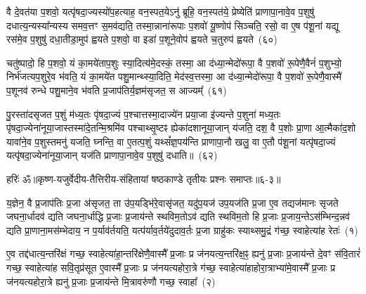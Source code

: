 वै दे॒वत॑या प॒शवो॒ यत्पृ॑षदा॒ज्यस्यो॑प॒हत्याह॒ वन॒स्पत॒ये\-ऽनु॑ ब्रूहि॒ वन॒स्पत॑ये॒ प्रेष्येति॑ प्राणापा॒नावे॒व प॒शुषु॑ दधात्य॒न्यस्या᳚न्यस्य समव॒त्तꣳ स॒मव॑द्यति॒ तस्मा॒न्नाना॑रूपाः प॒शवो॑ यू॒ष्णोप॑ सिञ्चति॒ रसो॒ वा ए॒ष प॑शू॒नां यद्यू रस॑मे॒व प॒शुषु॑ दधा॒तीडा॒मुप॑ ह्वयते प॒शवो॒ वा इडा॑ प॒शूने॒वोप॑ ह्वयते च॒तुरुप॑ ह्वयते~(६०)\ip

चतु॑ष्पादो॒ हि प॒शवो॒ यं का॒मये॑ताप॒शुः स्या॒दित्य॑मे॒दस्कं॒ तस्मा॒ आ द॑ध्या॒न्मेदो॑रूपा॒ वै प॒शवो॑ रू॒पेणै॒वैनं॑ प॒शुभ्यो॒ निर्भ॑जत्यप॒शुरे॒व भ॑वति॒ यं का॒मये॑त पशु॒मान्थ्स्या॒दिति॒ मेद॑स्व॒त्तस्मा॒ आ द॑ध्या॒न्मेदो॑रूपा॒ वै प॒शवो॑ रू॒पेणै॒वास्मै॑ प॒शूनव॑ रुन्धे पशु॒माने॒व भ॑वति प्र॒जा\-प॑तिर्य॒ज्ञम॑सृजत॒ स आज्यम्᳚~(६१)\ip

पु॒रस्ता॑दसृजत प॒शुं म॑ध्य॒तः पृ॑षदा॒ज्यं प॒श्चात्तस्मा॒दाज्ये॑न प्रया॒जा इ॑ज्यन्ते प॒शुना॑ मध्य॒तः पृ॑षदा॒ज्येना॑नूया॒जास्तस्मा॑दे॒तन्मि॒श्रमि॑व पश्चाथ्सृ॒ष्टꣴ ह्येका॑\-दशानूया॒जान् य॑जति॒ दश॒ वै प॒शोः प्रा॒णा आ॒त्मैका॑द॒शो यावा॑ने॒व प॒शुस्तमनु॑ यजति॒ घ्नन्ति॒ वा ए॒तत्प॒शुं यथ्सं᳚ज्ञ॒पय॑न्ति प्राणापा॒नौ खलु॒ वा ए॒तौ प॑शू॒नां यत्पृ॑षदा॒ज्यं यत्पृ॑षदा॒ज्येना॑नूया॒जान् यज॑ति प्राणापा॒नावे॒व प॒शुषु॑ दधाति॥~(६२)\ip

{\anuvakamend[{घ्नन्ति॒ यन्तं॒ खलु॑ च॒तुरुप॑ ह्वयत॒ आज्यं॒ यत्पृ॑षदा॒ज्येन॒ षट्च॑}]}%

{हरिः॑ ॐ}{॥कृष्ण-यजुर्वेदीय-तैत्तिरीय-संहितायां षष्ठकाण्डे तृतीयः प्रश्नः समाप्तः॥६-३॥}



\setcounter{anuvakam}{0}
य॒ज्ञेन॒ वै प्र॒जा\-प॑तिः प्र॒जा अ॑सृजत॒ ता उ॑प॒यड्भि॑रे॒वासृ॑जत॒ यदु॑प॒यज॑ उप॒यज॑ति प्र॒जा ए॒व तद्यज॑मानः सृजते जघना॒र्धादव॑ द्यति जघना॒र्धाद्धि प्र॒जाः प्र॒जाय॑न्ते स्थविम॒तो\-ऽव॑ द्यति स्थविम॒तो हि प्र॒जाः प्र॒जाय॒न्ते\-ऽस॑म्भिन्द॒न्नव॑ द्यति प्रा॒णाना॒मस॑म्भेदाय॒ न प॒र्याव॑र्तयति॒ यत्प॑र्याव॒र्तये॑दुदाव॒र्तः प्र॒जा ग्राहु॑कः स्याथ्समु॒द्रं ग॑च्छ॒ स्वाहेत्या॑ह रेतः॑~(१)\ip

ए॒व तद्द॑धात्य॒न्तरि॑क्षं गच्छ॒ स्वाहेत्या॑हा॒न्तरि॑क्षेणै॒वास्मै᳚ प्र॒जाः प्र ज॑नयत्य॒न्तरि॑क्ष॒ꣴ॒ ह्यनु॑ प्र॒जाः प्र॒जाय॑न्ते दे॒वꣳ स॑वि॒तारं॑ गच्छ॒ स्वाहेत्या॑ह सवि॒तृप्र॑सूत ए॒वास्मै᳚ प्र॒जाः प्र ज॑नयत्यहोरा॒त्रे ग॑च्छ॒ स्वाहेत्या॑हाहोरा॒त्राभ्या॑मे॒वास्मै᳚ प्र॒जाः प्र ज॑नयत्यहोरा॒त्रे ह्यनु॑ प्र॒जाः प्र॒जाय॑न्ते मि॒त्रावरु॑णौ गच्छ॒ स्वाहा᳚~(२)\ip

